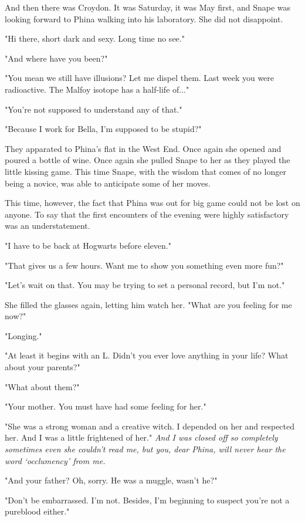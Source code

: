 \documentclass[a4paper,11pt]{article}
\begin{document}
And then there was Croydon. It was Saturday, it was May first, and Snape was looking forward to Phina walking into his laboratory. She did not disappoint.

"Hi there, short dark and sexy. Long time no see."

"And where have you been?"

"You mean we still have illusions? Let me dispel them. Last week you were radioactive. The Malfoy isotope has a half-life of..."

"You're not supposed to understand any of that."

"Because I work for Bella, I'm supposed to be stupid?"

They apparated to Phina's flat in the West End. Once again she opened and poured a bottle of wine. Once again she pulled Snape to her as they played the little kissing game. This time Snape, with the wisdom that comes of no longer being a novice, was able to anticipate some of her moves.

This time, however, the fact that Phina was out for big game could not be lost on anyone. To say that the first encounters of the evening were highly satisfactory was an understatement.

"I have to be back at Hogwarts before eleven."

"That gives us a few hours. Want me to show you something even more fun?"

"Let's wait on that. You may be trying to set a personal record, but I'm not."

She filled the glasses again, letting him watch her. "What are you feeling for me now?"

"Longing."

"At least it begins with an L. Didn't you ever love anything in your life? What about your parents?"

"What about them?"

"Your mother. You must have had some feeling for her."

"She was a strong woman and a creative witch. I depended on her and respected her. And I was a little frightened of her." \emph{And I was closed off so completely sometimes even she couldn't read me, but you, dear Phina, will never hear the word `occlumency' from me.}

"And your father? Oh, sorry. He was a muggle, wasn't he?"

"Don't be embarrassed. I'm not. Besides, I'm beginning to suspect you're not a pureblood either."
\end{document}
